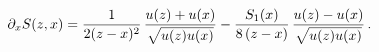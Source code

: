 \begin{equation}
\partial_x S(z, x) = { 1\over  2(z-x)^2 }
\, {u(z) + u(x) \over \sqrt{u(z)u(x)}  }  - {S_1(x) \over 8\,
(z-x) } \, {u(z) - u(x) \over \sqrt{u(z)u(x)} } \,   .
\label{eqpartial}
\end{equation}

